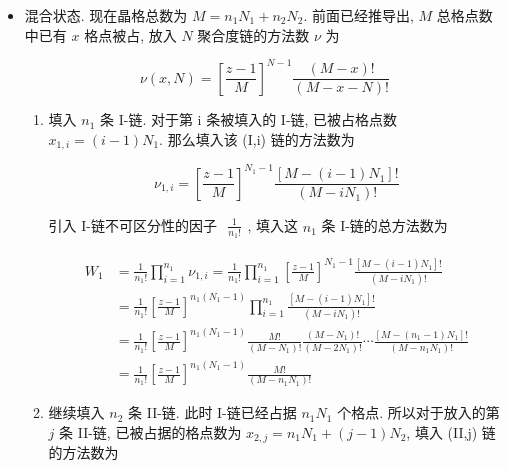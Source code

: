 \documentclass[../../main.tex]{subfiles}
\begin{document}
\begin{enumerate}
{{\begin{itemize}
II-链同理可得 $\begin{aligned}\Omega_{2} = \frac{M_{2}!}{n_{2}!}\left[\frac{z-1}{M_{2}}\right]^{n_{2}(N_{2}-1)}\end{aligned}$, 分离状态下的总状态数为 

$$
\begin{aligned}
\Omega_{\text{sep}} &= \Omega_{1}\Omega_{2} = \frac{M_{1}!}{n_{1}!}\left[\frac{z-1}{M_{1}}\right]^{n_{1}(N_{1}-1)}  \frac{M_{2}!}{n_{2}!}\left[\frac{z-1}{M_{2}}\right]^{n_{2}(N_{2}-1)}\\
&= \frac{M_{1}!M_{2}!}{n_{1}!n_{2}!} \left[\frac{z-1}{M_{1}}\right]^{n_{1}(N_{1}-1)} \left[\frac{z-1}{M_{2}}\right]^{n_{2}(N_{2}-1)}
\end{aligned}
$$
    \item 混合状态. 现在晶格总数为 $M = n_{1}N_{1} + n_{2}N_{2}$. 前面已经推导出, $M$ 总格点数中已有 $x$ 格点被占, 放入 $N$ 聚合度链的方法数 $\nu$ 为

$$
\nu(x,N) = \left[\frac{z-1}{M}\right]^{N-1}\frac{(M-x)!}{(M-x-N)!}
$$

\begin{enumerate}
    \item 填入 $n_{1}$ 条 I-链. 对于第 i 条被填入的 I-链, 已被占格点数 $x_{1,i}=(i-1)N_{1}$. 那么填入该 (I,i) 链的方法数为

$$
\nu_{1,i} = \left[\frac{z-1}{M}\right]^{N_{1}-1}\frac{[M-(i-1)N_{1}]!}{(M-iN_{1})!}
$$

引入 I-链不可区分性的因子 $\begin{aligned}\frac{1}{n_{1}!}\end{aligned}$, 填入这 $n_{1}$ 条 I-链的总方法数为

$$
\begin{aligned}
W_{1} &= \frac{1}{n_{1}!}\prod_{i=1}^{n_{1}}\nu_{1,i} = \frac{1}{n_{1}!}\prod_{i=1}^{n_{1}}  \left[\frac{z-1}{M}\right]^{N_{1}-1} \frac{[M-(i-1)N_{1}]!}{(M-iN_{1})!}\\
&= \frac{1}{n_{1}!} \left[\frac{z-1}{M}\right]^{n_{1}(N_{1}-1)} \prod_{i=1}^{n_{1}} \frac{[M-(i-1)N_{1}]!}{(M-iN_{1})!}\\
&= \frac{1}{n_{1}!} \left[\frac{z-1}{M}\right]^{n_{1}(N_{1}-1)} \frac{M!}{(M-N_{1})!} \frac{(M-N_{1})!}{(M-2N_{1})!}\cdots \frac{[M-(n_{1}-1)N_{1}]!}{(M-n_{1}N_{1})!}\\
&= \frac{1}{n_{1}!}\left[\frac{z-1}{M}\right]^{n_{1}(N_{1}-1)}\frac{M!}{(M-n_{1}N_{1})!}
\end{aligned}
$$
    \item 继续填入 $n_{2}$ 条 II-链. 此时 I-链已经占据 $n_{1}N_{1}$ 个格点. 所以对于放入的第 $j$ 条 II-链, 已被占据的格点数为 $x_{2,j} = n_{1}N_{1} + (j-1)N_{2}$, 填入 (II,j) 链的方法数为


\end{enumerate}
\end{itemize}}}
\end{enumerate}
\end{document}

